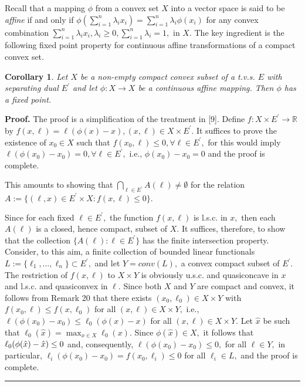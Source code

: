 \documentclass{article}
\newtheorem{corollary}[theorem]{Corollary}
\newenvironment{proof}[1][Proof]{\noindent\textbf{#1.} }{\ \rule{0.5em}{0.5em}}
\begin{document}
Recall that a mapping $\phi $ from a convex set $X$ into a vector space is
said to be \textit{affine} if and only if $\phi (\sum_{i=1}^{n}\lambda
_{i}x_{i})=\sum_{i=1}^{n}\lambda _{i}\phi (x_{i})$ for any convex
combination $\sum_{i=1}^{n}\lambda _{i}x_{i},\lambda _{i}\geq
0,\sum_{i=1}^{n}\lambda _{i}=1,$ in $X.$ The key ingredient is the following
fixed point property for continuous affine transformations of a compact
convex set.

\begin{corollary}
Let $X$ be a non-empty compact convex subset of a t.v.s. $E$ with separating
dual $E^{\prime }$ and let $\phi :X\longrightarrow X$ be a continuous affine
mapping. Then $\phi $ has a fixed point.
\end{corollary}

\begin{proof}
The proof is a simplification of the treatment in [9]. Define $f:X\times
E^{\prime }\longrightarrow 
\mathbb{R}
$ by $f(x,\ell )=\ell (\phi (x)-x),(x,\ell )\in X\times E^{\prime }.$ It
suffices to prove the existence of $x_{0}\in X$ such that $f(x_{0},\ell
)\leq 0,\forall \ell \in E^{\prime },$ for this would imply $\ell (\phi
(x_{0})-x_{0})=0,\forall \ell \in E^{\prime },$ i.e., $\phi (x_{0})-x_{0}=0$
and the proof is complete.

This amounts to showing that $\bigcap_{\ell \in E^{\prime }}A(\ell )\neq
\emptyset $ for the relation $A:=\{(\ell ,x)\in E^{\prime }\times X:f(x,\ell
)\leq 0\}.$

Since for each fixed $\ell \in E^{\prime },$ the function $f(x,\ell )$ is
l.s.c. in $x,$ then each $A(\ell )$ is a closed, hence compact, subset of $%
X. $ It suffices, therefore, to show that the collection $\{A(\ell ):\ell
\in E^{\prime }\}$ has the finite intersection property. Consider, to this
aim, a finite collection of bounded linear functionals $L:=\{\ell
_{1},\ldots ,\ell _{n}\}\subset E^{\prime },$ and let $Y=conv(L),$ a convex
compact subset of $E^{\prime }.$ The restriction of $f(x,\ell )$ to $X\times
Y$ is obviously u.s.c. and quasiconcave in $x$ and l.s.c. and quasiconvex in 
$\ell .$ Since both $X$ and $Y$ are compact and convex, it follows from
Remark 20 that there exists $(x_{0},\ell _{0})\in X\times Y$ with $%
f(x_{0},\ell )\leq f(x,\ell _{0})$ for all $(x,\ell )\in X\times Y,$ i.e., $%
\ell (\phi (x_{0})-x_{0})\leq \ell _{0}(\phi (x)-x)$ for all $(x,\ell )\in
X\times Y.$ Let $\hat{x}$ be such that $\ell _{0}(\hat{x})=\max_{x\in X}\ell
_{0}(x).$ Since $\phi (\hat{x})\in X,$ it follows that $\ell _{0}(\phi (\hat{%
x})-\hat{x})\leq 0$ and, consequently, $\ell (\phi (x_{0})-x_{0})\leq 0,$
for all $\ell \in Y,$ in particular, $\ell _{i}(\phi
(x_{0})-x_{0})=f(x_{0},\ell _{i})\leq 0$ for all $\ell _{i}\in L,$ and the
proof is complete.
\end{proof}
\end{document}
